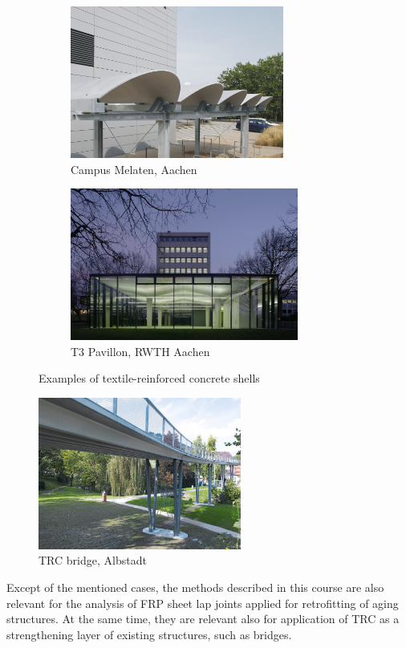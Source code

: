 \documentclass[main.tex]{subfiles}
\begin{document}
\begin{figure}[tb]
\centering
\begin{subfigure}{0.45\linewidth}
	\centering
  \includegraphics[height=5cm]{fig/Lecture01/vault_shell.png}
	\caption{Campus Melaten, Aachen}
	\label{fig:vault_shell}
\end{subfigure}
\hspace{0.5cm}%
\begin{subfigure}{0.45\linewidth}
	\centering
  \includegraphics[height=5cm]{fig/Lecture01/t3.png}
	\caption{T3 Pavillon, RWTH Aachen}
	\label{fig:t3_pavillon}
\end{subfigure}
\caption{Examples of textile-reinforced concrete shells}
\label{fig:shells}
\end{figure}
\begin{figure}
\centering
  \includegraphics[height=5cm]{fig/Lecture01/trc_alpstadt.png}
	\caption{TRC bridge, Albstadt}
	\label{fig:albstadt}
\end{figure}

Except of the mentioned cases, the methods described in this course are also relevant for the analysis of FRP sheet lap joints applied for retrofitting of aging structures. At the same time, they are relevant also for application of TRC as a  strengthening layer of existing structures, such as bridges.
\end{document}
